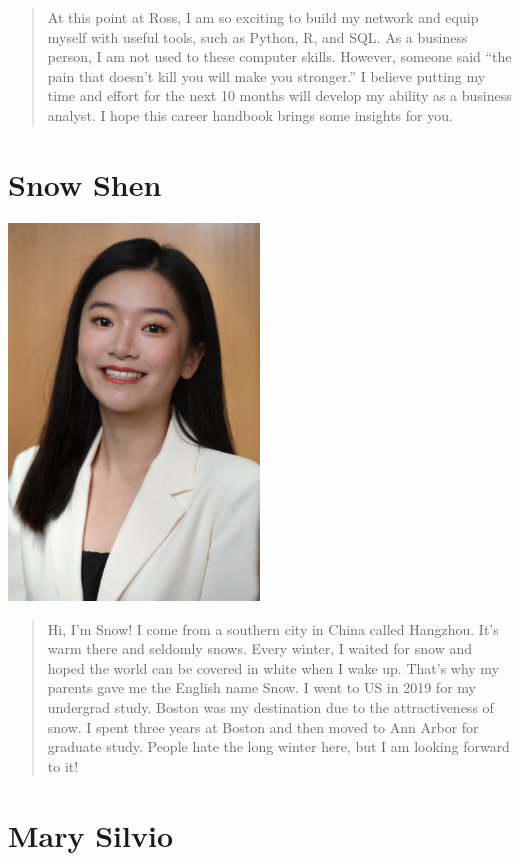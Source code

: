 \documentclass[
]{book}
\begin{document}
\begin{quote}
At this point at Ross, I am so exciting to build my network and equip myself with useful tools, such as Python, R, and SQL. As a business person, I am not used to these computer skills. However, someone said ``the pain that doesn't kill you will make you stronger.'' I believe putting my time and effort for the next 10 months will develop my ability as a business analyst. I hope this career handbook brings some insights for you.
\end{quote}

\hypertarget{snow-shen}{%
\section{Snow Shen}\label{snow-shen}}

\includegraphics[width=0.5\textwidth,height=\textheight]{Images/Snow.png}

\begin{quote}
Hi, I'm Snow! I come from a southern city in China called Hangzhou. It's warm there and seldomly snows. Every winter, I waited for snow and hoped the world can be covered in white when I wake up. That's why my parents gave me the English name Snow. I went to US in 2019 for my undergrad study. Boston was my destination due to the attractiveness of snow. I spent three years at Boston and then moved to Ann Arbor for graduate study. People hate the long winter here, but I am looking forward to it!
\end{quote}

\hypertarget{mary-silvio}{%
\section{Mary Silvio}\label{mary-silvio}}
\end{document}
